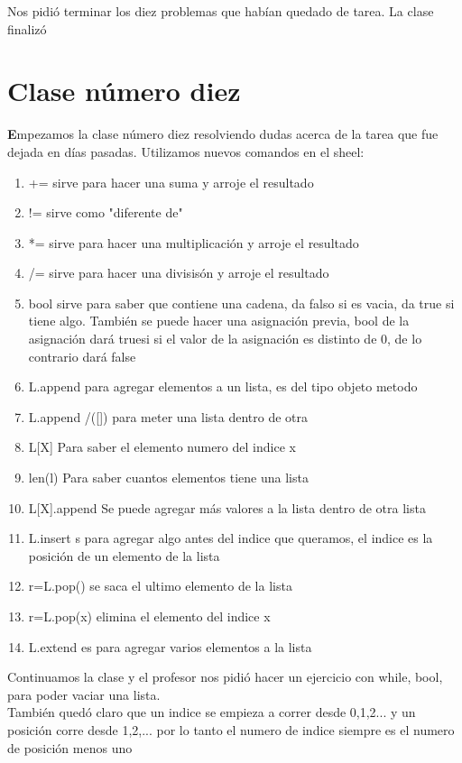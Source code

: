 \documentclass{book}
\begin{document}
\begin{enumerate}
\begin{enumerate}
Nos pidió terminar los diez problemas que habían quedado de tarea.
La clase finalizó

\chapter{Clase número diez}
\textbf Empezamos la clase número diez resolviendo dudas acerca de la tarea que fue dejada en días pasadas. Utilizamos nuevos comandos en el sheel:
\begin{enumerate}
	\item += sirve para hacer una suma y arroje el resultado
	\item != sirve como "diferente de"
	\item *= sirve para hacer una multiplicación y arroje el resultado
	\item /= sirve para hacer una divisisón y arroje el resultado
	\item bool sirve para saber que contiene una cadena, da falso si es vacia, da true si tiene algo. También se puede hacer una asignación previa, bool de la asignación dará truesi si el valor de la asignación es distinto de 0, de lo contrario dará false
	\item L.append para agregar elementos a un lista, es del tipo objeto metodo
	\item L.append /([]) para meter una lista dentro de otra
	\item L[X] Para saber el elemento numero del indice x 
	\item len(l) Para saber cuantos elementos tiene una lista
	\item L[X].append Se puede agregar más valores a la lista dentro de otra lista
	\item L.insert s para agregar algo antes del indice que queramos, el indice es la posición de un elemento de la lista
	\item r=L.pop() se saca el ultimo elemento de la lista
	\item r=L.pop(x) elimina el elemento del indice x
	\item L.extend es para agregar varios elementos a la lista
	
\end{enumerate} 
Continuamos la clase y el profesor nos pidió hacer un ejercicio con while, bool, para poder vaciar una lista.\\ 
También quedó claro que un indice se empieza a correr desde 0,1,2... y un posición corre desde 1,2,... por lo tanto el numero de indice siempre es el numero de posición menos uno\\


\end{enumerate}
\end{enumerate}
\end{document}
